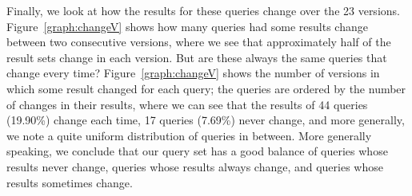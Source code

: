 \documentclass[runningheads]{llncs}
\begin{document}
Finally, we look at how the results for these queries change over the 23 versions. Figure~\ref{graph:changeV} shows how many queries had some results change between two consecutive versions, where we see that approximately half of the result sets change in each version. But are these always the same queries that change every time? Figure~\ref{graph:changeV} shows the number of versions in which some result changed for each query; the queries are ordered by the number of changes in their results, where we can see that the results of 44 queries (19.90\%) change each time, 17 queries (7.69\%) never change, and more generally, we note a quite uniform distribution of queries in between. More generally speaking, we conclude that our query set has a good balance of queries whose results never change, queries whose results always change, and queries whose results sometimes change.
\end{document}
